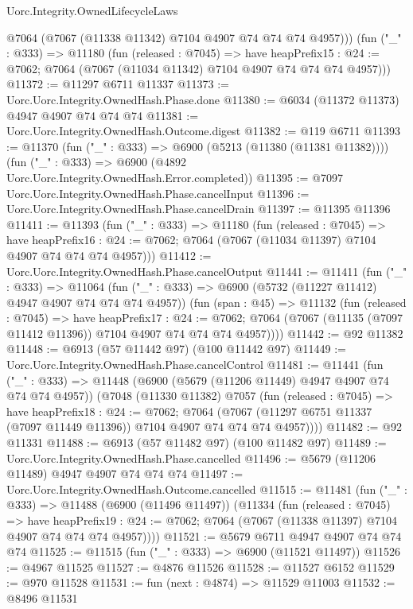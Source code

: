 \begin{lexlean}{Uorc.Integrity.OwnedLifecycleLaws}
\begin{coremodule}
      @7064 (@7067 (@11338 @11342) @7104 @4907 @74 @74 @74 @4957)))
    (fun ("_" : @333) =>
    @11180
      (fun (released : @7045) =>
      have heapPrefix15 : @24 := @7062;
      @7064 (@7067 (@11034 @11342) @7104 @4907 @74 @74 @74 @4957)))
@11372 := @11297 @6711 @11337
@11373 := Uorc.Uorc.Integrity.OwnedHash.Phase.done
@11380 := @6034 (@11372 @11373) @4947 @4907 @74 @74 @74
@11381 := Uorc.Uorc.Integrity.OwnedHash.Outcome.digest
@11382 := @119 @6711
@11393 := @11370
    (fun ("_" : @333) => @6900 (@5213 (@11380 (@11381 @11382))))
    (fun ("_" : @333) => @6900 (@4892 Uorc.Uorc.Integrity.OwnedHash.Error.completed))
@11395 := @7097 Uorc.Uorc.Integrity.OwnedHash.Phase.cancelInput
@11396 := Uorc.Uorc.Integrity.OwnedHash.Phase.cancelDrain
@11397 := @11395 @11396
@11411 := @11393
    (fun ("_" : @333) =>
    @11180
      (fun (released : @7045) =>
      have heapPrefix16 : @24 := @7062;
      @7064 (@7067 (@11034 @11397) @7104 @4907 @74 @74 @74 @4957)))
@11412 := Uorc.Uorc.Integrity.OwnedHash.Phase.cancelOutput
@11441 := @11411
    (fun ("_" : @333) =>
    @11064
      (fun ("_" : @333) => @6900 (@5732 (@11227 @11412) @4947 @4907 @74 @74 @74 @4957))
      (fun (span : @45) =>
      @11132
        (fun (released : @7045) =>
        have heapPrefix17 : @24 := @7062;
        @7064 (@7067 (@11135 (@7097 @11412 @11396)) @7104 @4907 @74 @74 @74 @4957))))
@11442 := @92 @11382
@11448 := @6913 (@57 @11442 @97) (@100 @11442 @97)
@11449 := Uorc.Uorc.Integrity.OwnedHash.Phase.cancelControl
@11481 := @11441
    (fun ("_" : @333) =>
    @11448
      (@6900 (@5679 (@11206 @11449) @4947 @4907 @74 @74 @74 @4957))
      (@7048
        (@11330 @11382)
        @7057
        (fun (released : @7045) =>
        have heapPrefix18 : @24 := @7062;
        @7064 (@7067 (@11297 @6751 @11337 (@7097 @11449 @11396)) @7104 @4907 @74 @74 @74 @4957))))
@11482 := @92 @11331
@11488 := @6913 (@57 @11482 @97) (@100 @11482 @97)
@11489 := Uorc.Uorc.Integrity.OwnedHash.Phase.cancelled
@11496 := @5679 (@11206 @11489) @4947 @4907 @74 @74 @74
@11497 := Uorc.Uorc.Integrity.OwnedHash.Outcome.cancelled
@11515 := @11481
    (fun ("_" : @333) =>
    @11488
      (@6900 (@11496 @11497))
      (@11334
        (fun (released : @7045) =>
        have heapPrefix19 : @24 := @7062;
        @7064 (@7067 (@11338 @11397) @7104 @4907 @74 @74 @74 @4957))))
@11521 := @5679 @6711 @4947 @4907 @74 @74 @74
@11525 := @11515 (fun ("_" : @333) => @6900 (@11521 @11497))
@11526 := @4967 @11525
@11527 := @4876 @11526
@11528 := @11527 @6152
@11529 := @970 @11528
@11531 := fun (next : @4874) => @11529 @11003
@11532 := @8496 @11531

\end{coremodule}
\end{lexlean}
